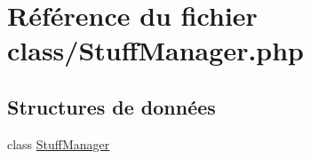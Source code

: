 \hypertarget{_stuff_manager_8php}{}\section{Référence du fichier class/\+Stuff\+Manager.php}
\label{_stuff_manager_8php}
\subsection*{Structures de données}
\begin{DoxyCompactItemize}
\item 
class \mbox{\hyperlink{class_stuff_manager}{Stuff\+Manager}}
\end{DoxyCompactItemize}
